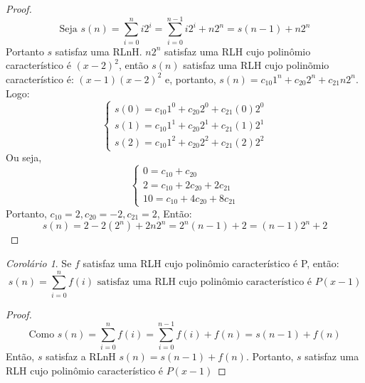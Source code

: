 \documentclass[a4paper,11pt]{article}
\theoremstyle{definition} \newtheorem{definicao}{Def}
\theoremstyle{definition} \newtheorem{exemplo}{Exemplo}
\theoremstyle{plain}      \newtheorem{teorema}{Teorema}
\theoremstyle{remark}     \newtheorem*{corolario}{Corol\'{a}rio}
\begin{document}
\begin{proof}
\begin{equation*}
\text{Seja } s(n) = \sum_{i=0}^{n}i2^i =
\sum_{i=0}^{n-1}i2^i + n2^n = s(n-1) + n2^n
\end{equation*}
Portanto $s$ satisfaz uma RLnH. $n2^n$ satisfaz uma RLH cujo
polin\^{o}mio caracter\'{i}stico \'{e} $(x-2)^2$, ent\~{a}o
$s(n)$ satisfaz uma RLH cujo polin\~{o}mio caracter\'{i}stico
\'{e}: $(x-1)(x-2)^2$ e, portanto,
$s(n) = c_{10}1^n + c_{20}2^n + c_{21}n2^n$. Logo:
\begin{equation*}
\begin{cases}
s(0) = c_{10}1^0 + c_{20}2^0 + c_{21}(0)2^0 \\
s(1) = c_{10}1^1 + c_{20}2^1 + c_{21}(1)2^1 \\
s(2) = c_{10}1^2 + c_{20}2^2 + c_{21}(2)2^2
\end{cases}
\end{equation*}
Ou seja,
\begin{equation*}
\begin{cases}
0 = c_{10} + c_{20} \\
2 = c_{10} + 2c_{20} + 2c_{21} \\
10 = c_{10} + 4c_{20} + 8c_{21}
\end{cases}
\end{equation*}
Portanto, $c_{10} = 2, c_{20} = -2, c_{21} = 2$, Ent\~{a}o:\\
\begin{equation*}
s(n) = 2 -2(2^n) + 2n2^n = 2^n(n-1)+2=(n-1)2^n + 2
\end{equation*}
\end{proof}

\begin{corolario}
Se $f$ satisfaz uma RLH cujo polin\^{o}mio caracter\'{i}stico
\'{e} P, ent\~{a}o:
\begin{equation*}
s(n) = \sum_{i=0}^{n} f(i) \text{ satisfaz uma RLH cujo polin\^{o}mio
caracter\'{i}stico \'{e} } P(x-1)
\end{equation*}
\end{corolario}

\begin{proof}
\begin{equation*}
\text{Como } s(n) = \sum_{i=0}^{n}f(i) = \sum_{i=0}^{n-1}f(i) + f(n)=
s(n-1) + f(n)
\end{equation*}
Ent\~{a}o, $s$ satisfaz a RLnH $s(n)=s(n-1)+f(n)$. Portanto,
$s$ satisfaz uma RLH cujo polin\^{o}mio caracter\'{i}stico \'{e}
$P(x-1)$
\end{proof}
\end{document}
